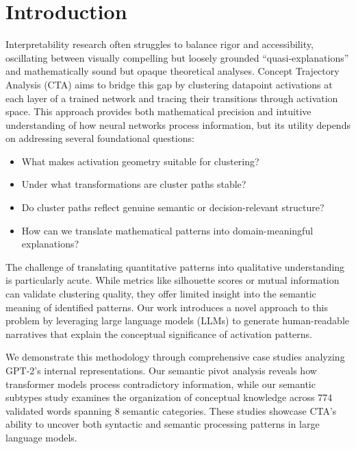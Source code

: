 \section{Introduction}

Interpretability research often struggles to balance rigor and accessibility, oscillating between visually compelling but loosely grounded ``quasi-explanations'' and mathematically sound but opaque theoretical analyses. Concept Trajectory Analysis (CTA) aims to bridge this gap by clustering datapoint activations at each layer of a trained network and tracing their transitions through activation space. This approach provides both mathematical precision and intuitive understanding of how neural networks process information, but its utility depends on addressing several foundational questions:

\begin{itemize}
    \item What makes activation geometry suitable for clustering?
    \item Under what transformations are cluster paths stable?
    \item Do cluster paths reflect genuine semantic or decision-relevant structure?
    \item How can we translate mathematical patterns into domain-meaningful explanations?
\end{itemize}

The challenge of translating quantitative patterns into qualitative understanding is particularly acute. While metrics like silhouette scores or mutual information can validate clustering quality, they offer limited insight into the semantic meaning of identified patterns. Our work introduces a novel approach to this problem by leveraging large language models (LLMs) to generate human-readable narratives that explain the conceptual significance of activation patterns.

We demonstrate this methodology through comprehensive case studies analyzing GPT-2's internal representations. Our semantic pivot analysis reveals how transformer models process contradictory information, while our semantic subtypes study examines the organization of conceptual knowledge across 774 validated words spanning 8 semantic categories. These studies showcase CTA's ability to uncover both syntactic and semantic processing patterns in large language models.

